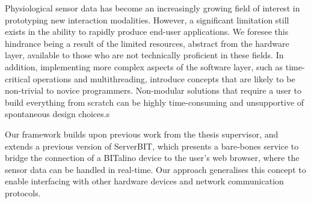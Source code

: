 Physiological sensor data has become an increasingly growing field of interest in prototyping new interaction modalities. However, a significant limitation still exists in the ability to rapidly produce end-user applications\cite{alves_signalbit:_2013}. We foresee this hindrance being a result of the limited resources, abstract from the hardware layer, available to those who are not technically proficient in these fields. In addition, implementing more complex aspects of the software layer, such as time-critical operations and multithreading, introduce concepts that are likely to be non-trivial to novice programmers. Non-modular solutions that require a user to build everything from scratch can be highly time-consuming and unsupportive of spontaneous design choices.s


Our framework builds upon previous work from the thesis supervisor, \citeauthor{da_silva_web-based_2012} \cite{da_silva_web-based_2012,da_silva_bit:_2014} and extends a previous version of ServerBIT, which presents a bare-bones service to bridge the connection of a BITalino device to the user's web browser, where the sensor data can be handled in real-time. Our approach generalises this concept to enable interfacing with other hardware devices and network communication protocols.


